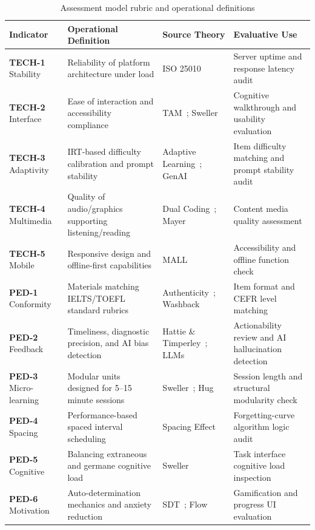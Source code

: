\documentclass[11pt,a4paper]{article}
\begin{document}
\begin{table}[t]
  \caption{Assessment model rubric and operational definitions}
  \label{tab:rubric}
  \centering
  \small
  \renewcommand{\arraystretch}{1.1}
  \begin{tabular}{@{} L{2.0cm} L{5.4cm} L{3.1cm} L{3.1cm} @{} }
    \toprule
    \textbf{Indicator} & \textbf{Operational Definition} & \textbf{Source Theory} & \textbf{Evaluative Use} \\
    \midrule
    \textbf{TECH-1} Stability & Reliability of platform architecture under load & ISO 25010~\cite{b14} & Server uptime and response latency audit \\
    \textbf{TECH-2} Interface & Ease of interaction and accessibility compliance & TAM~\cite{b11}; Sweller~\cite{b16} & Cognitive walkthrough and usability evaluation \\
    \textbf{TECH-3} Adaptivity & IRT-based difficulty calibration and prompt stability & Adaptive Learning~\cite{b15}; GenAI~\cite{b37}\cite{b40} & Item difficulty matching and prompt stability audit \\
    \textbf{TECH-4} Multimedia & Quality of audio/graphics supporting listening/reading & Dual Coding~\cite{b19}; Mayer~\cite{b20} & Content media quality assessment \\
    \textbf{TECH-5} Mobile & Responsive design and offline-first capabilities & MALL~\cite{b5} & Accessibility and offline function check \\
    \midrule
    \textbf{PED-1} Conformity & Materials matching IELTS/TOEFL standard rubrics & Authenticity~\cite{b1}; Washback~\cite{b21} & Item format and CEFR level matching \\
    \textbf{PED-2} Feedback & Timeliness, diagnostic precision, and AI bias detection & Hattie \& Timperley~\cite{b17}; LLMs~\cite{b38}\cite{b39} & Actionability review and AI hallucination detection \\
    \textbf{PED-3} Micro-learning & Modular units designed for 5--15 minute sessions & Sweller~\cite{b16}; Hug~\cite{b22} & Session length and structural modularity check \\
    \textbf{PED-4} Spacing & Performance-based spaced interval scheduling & Spacing Effect~\cite{b23} & Forgetting-curve algorithm logic audit \\
    \textbf{PED-5} Cognitive & Balancing extraneous and germane cognitive load & Sweller~\cite{b16} & Task interface cognitive load inspection \\
    \textbf{PED-6} Motivation & Auto-determination mechanics and anxiety reduction & SDT~\cite{b12}; Flow~\cite{b24} & Gamification and progress UI evaluation \\

\end{tabular}
\end{table}
\end{document}
